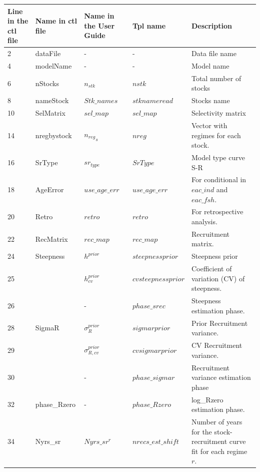 \documentclass{article}
\begin{document}
\begin{table}[H]
    \centering
    \begin{tabular}{||  p{1.5cm} | p{1.9cm}  | p{1.9cm} | l | p{7cm} ||}
\hline
Line in the ctl file & Name in ctl file  & Name in the User Guide & Tpl name & Description\\ \hline  \hline
2 & dataFile & - & - & Data file name\\ \hline
4 & modelName & - & - & Model name\\ \hline
 6 &  nStocks & $n_{stk}$  & $nstk$ & Total number of stocks\\ \hline
8 &  nameStock & $Stk\_names$ & $stknameread$   & Stocks name\\ \hline
10 &  SelMatrix & $sel\_map$  & $sel\_map$ & Selectivity matrix\\ \hline
14 &  nregbystock &  ${n_{reg}}_s$ & $nreg$ & Vector with regimes for each stock.\\ \hline
16 &  SrType & $sr_{type}$  & $SrType$ & Model type curve S-R\\ \hline
18 &  AgeError & $use\_age\_err$  & $use\_age\_err$ & For conditional in $eac\_ind$ and $eac\_fsh$.\\ \hline
20 &  Retro & $retro$  & $retro$ & For retrospective analysis.\\ \hline
22 & RecMatrix &  $rec\_map$ & $rec\_map$ & Recruitment matrix.\\ \hline
24 &  Steepness & $h^{prior}$  & $steepnessprior$ & Steepness prior\\ %
25 &            & $h^{prior}_{cv}$  & $cvsteepnessprior$ & Coefficient of variation (CV) of steepness.\\ %
26 &            & -  & $phase\_srec$ & Steepness estimation phase.\\ \hline
28 &  SigmaR & $\sigma_{R}^{prior}$ & $sigmarprior$ & Prior Recruitment variance.
\\ %
29 &         &  $\sigma_{R,cv}^{prior}$ & $cvsigmarprior$ & CV Recruitment variance.\\ %
30 &         & -  & $phase\_sigmar$ & Recruitment variance estimation phase \\ \hline
32 &  phase\_Rzero & -  & $phase\_Rzero$ & log\_Rzero estimation phase.\\ \hline
34 &  Nyrs\_sr &   $Nyrs\_sr^r$& $nrecs\_est\_shift$ & Number of years for the stock-recruitment curve fit for each regime $r$.\\ \hline

\end{tabular}
\end{table}
\end{document}
